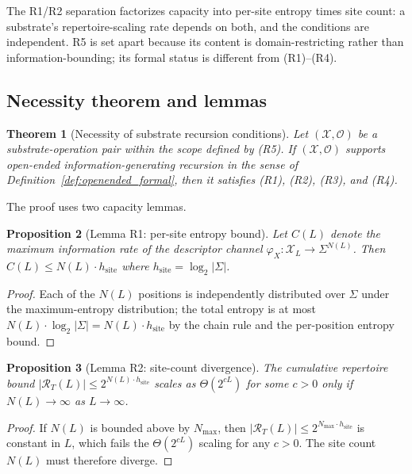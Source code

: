 \documentclass[11pt]{article}
\theoremstyle{plain}
\newtheorem{theorem}{Theorem}
\newtheorem{proposition}[theorem]{Proposition}
\theoremstyle{definition}
\newcommand{\descX}{\varphi_X}
\newcommand{\Xset}{\mathcal{X}}
\newcommand{\Op}{\mathcal{O}}
\begin{document}
The R1/R2 separation factorizes capacity into per-site entropy times site count: a substrate's repertoire-scaling rate depends on both, and the conditions are independent. R5 is set apart because its content is domain-restricting rather than information-bounding; its formal status is different from (R1)--(R4).

\subsection{Necessity theorem and lemmas}

\begin{theorem}[Necessity of substrate recursion conditions]
\label{thm:principle_necessity}
Let $(\Xset, \Op)$ be a substrate-operation pair within the scope defined by \textnormal{(R5)}. If $(\Xset, \Op)$ supports open-ended information-generating recursion in the sense of Definition~\ref{def:openended_formal}, then it satisfies \textnormal{(R1)}, \textnormal{(R2)}, \textnormal{(R3)}, and \textnormal{(R4)}.
\end{theorem}

The proof uses two capacity lemmas.

\begin{proposition}[Lemma R1: per-site entropy bound]
\label{lemma:R1}
Let $C(L)$ denote the maximum information rate of the descriptor channel $\descX: \Xset_L \to \Sigma^{N(L)}$. Then $C(L) \le N(L) \cdot h_{\mathrm{site}}$ where $h_{\mathrm{site}} = \log_2 |\Sigma|$.
\end{proposition}

\begin{proof}
Each of the $N(L)$ positions is independently distributed over $\Sigma$ under the maximum-entropy distribution; the total entropy is at most $N(L) \cdot \log_2 |\Sigma| = N(L) \cdot h_{\mathrm{site}}$ by the chain rule and the per-position entropy bound.
\end{proof}

\begin{proposition}[Lemma R2: site-count divergence]
\label{lemma:R2}
The cumulative repertoire bound $|\mathcal{R}_T(L)| \le 2^{N(L) \cdot h_{\mathrm{site}}}$ scales as $\Theta(2^{cL})$ for some $c > 0$ only if $N(L) \to \infty$ as $L \to \infty$.
\end{proposition}

\begin{proof}
If $N(L)$ is bounded above by $N_{\max}$, then $|\mathcal{R}_T(L)| \le 2^{N_{\max} \cdot h_{\mathrm{site}}}$ is constant in $L$, which fails the $\Theta(2^{cL})$ scaling for any $c > 0$. The site count $N(L)$ must therefore diverge.
\end{proof}
\end{document}
